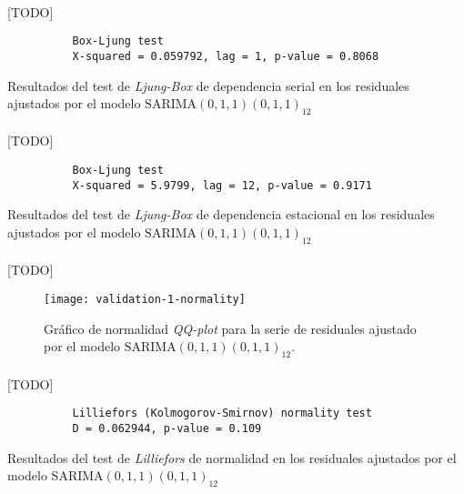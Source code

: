 \documentclass[a4paper, spanish]{article}
\begin{document}
      \paragraph{}
      [TODO]

      \begin{table}
        \begin{Verbatim}
          Box-Ljung test
          X-squared = 0.059792, lag = 1, p-value = 0.8068
        \end{Verbatim}
        \caption{Resultados del test de \emph{Ljung-Box} de dependencia serial en los residuales ajustados por el modelo $\text{SARIMA}(0, 1, 1)(0, 1, 1)_{12}$}
        \label{result:comparison_1_ljung_box_1}
      \end{table}

      \paragraph{}
      [TODO]

      \begin{table}
        \begin{Verbatim}
          Box-Ljung test
          X-squared = 5.9799, lag = 12, p-value = 0.9171
        \end{Verbatim}
        \caption{Resultados del test de \emph{Ljung-Box} de dependencia estacional en los residuales ajustados por el modelo $\text{SARIMA}(0, 1, 1)(0, 1, 1)_{12}$}
        \label{result:comparison_1_ljung_box_12}
      \end{table}

      \paragraph{}
      [TODO]

      \begin{figure}[htb!]
        \centering
        \texttt{[image: validation-1-normality]}
        \caption{Gráfico de normalidad \emph{QQ-plot} para la serie de residuales ajustado por el modelo $\text{SARIMA}(0, 1, 1)(0, 1, 1)_{12}$.}
        \label{img:validation_1_normality}
      \end{figure}

      \paragraph{}
      [TODO]

      \begin{table}
        \begin{Verbatim}
          Lilliefors (Kolmogorov-Smirnov) normality test
          D = 0.062944, p-value = 0.109
        \end{Verbatim}
        \caption{Resultados del test de \emph{Lilliefors} de normalidad en los residuales ajustados por el modelo $\text{SARIMA}(0, 1, 1)(0, 1, 1)_{12}$}
        \label{result:comparison_1_lilliefors}
      \end{table}
\end{document}
